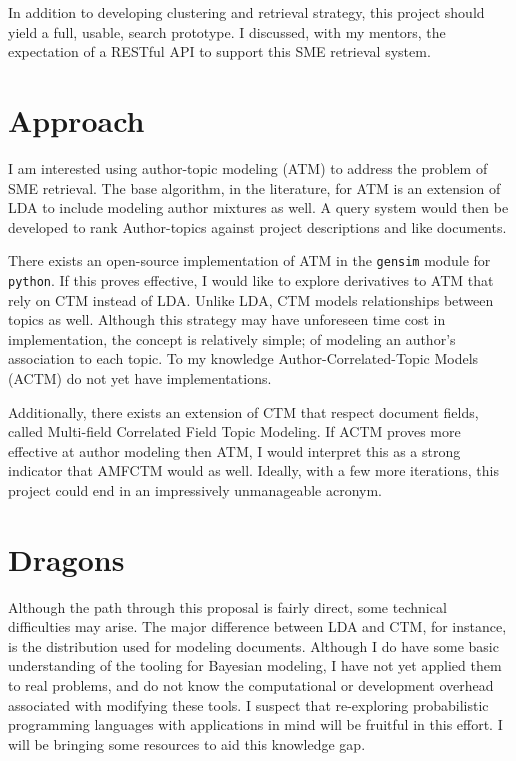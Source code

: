 \documentclass{article}
\begin{document}
\begin{multicols}{2}
In addition to developing clustering and retrieval strategy, this project should yield
a full, usable, search prototype. I discussed, with my mentors, the expectation of a
RESTful API to support this SME retrieval system.

\section{Approach}

I am interested using author-topic\cite{Rosen-Zvi2004} modeling (ATM) to address the
problem of SME retrieval. The base algorithm, in the literature, for ATM is an
extension of LDA to include modeling author mixtures as well. A
query system would then be developed to rank Author-topics against project
descriptions and like documents.

There exists an open-source implementation of ATM in the \texttt{gensim}\cite{rehurek_lrec}
module for \texttt{python}. If this proves effective, I would like to explore
derivatives to ATM that rely on CTM instead of LDA. Unlike LDA, CTM models
relationships between topics as well. Although this strategy may have unforeseen time
cost in implementation, the concept is relatively simple; of modeling an author's
association to each topic. To my knowledge Author-Correlated-Topic Models (ACTM) do not yet
have implementations.

Additionally, there exists an extension of CTM that respect document fields, called
Multi-field Correlated Field Topic Modeling\cite{Salomatin2009MultifieldCT}. If ACTM
proves more effective at author modeling then ATM, I would interpret this as a strong
indicator that AMFCTM would as well. Ideally, with a few more iterations, this
project could end in an impressively unmanageable acronym.

\section{Dragons}

Although the path through this proposal is fairly direct, some technical difficulties may arise.
The major difference between LDA and CTM, for instance, is the distribution used for modeling
documents. Although I do have some basic understanding of the tooling for Bayesian modeling,
I have not yet applied them to real problems, and do not know the computational or development
overhead associated with modifying these tools. I suspect that re-exploring probabilistic
programming languages with applications in mind will be fruitful in this effort.
I will be bringing some resources\cite{lambert2018} to aid this knowledge gap.


\end{multicols}
\end{document}
